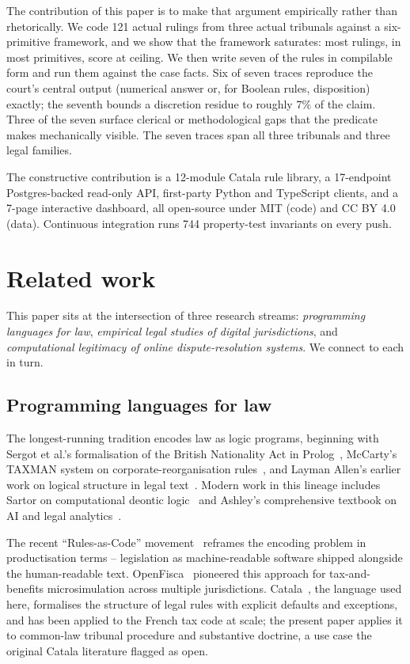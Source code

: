 \documentclass[11pt,letterpaper]{article}
\begin{document}
The contribution of this paper is to make that argument empirically rather than rhetorically. We code 121 actual rulings from three actual tribunals against a six-primitive framework, and we show that the framework saturates: most rulings, in most primitives, score at ceiling. We then write seven of the rules in compilable form and run them against the case facts. Six of seven traces reproduce the court's central output (numerical answer or, for Boolean rules, disposition) exactly; the seventh bounds a discretion residue to roughly 7\% of the claim. Three of the seven surface clerical or methodological gaps that the predicate makes mechanically visible. The seven traces span all three tribunals and three legal families.

The constructive contribution is a 12-module Catala rule library, a 17-endpoint Postgres-backed read-only API, first-party Python and TypeScript clients, and a 7-page interactive dashboard, all open-source under MIT (code) and CC BY 4.0 (data). Continuous integration runs 744 property-test invariants on every push.

\section{Related work}

This paper sits at the intersection of three research streams: \textit{programming languages for law}, \textit{empirical legal studies of digital jurisdictions}, and \textit{computational legitimacy of online dispute-resolution systems}. We connect to each in turn.

\subsection{Programming languages for law}

The longest-running tradition encodes law as logic programs, beginning with Sergot et al.'s formalisation of the British Nationality Act in Prolog~\cite{sergot}, McCarty's TAXMAN system on corporate-reorganisation rules~\cite{mccarty}, and Layman Allen's earlier work on logical structure in legal text~\cite{allen}. Modern work in this lineage includes Sartor on computational deontic logic~\cite{sartor} and Ashley's comprehensive textbook on AI and legal analytics~\cite{ashley}.

The recent ``Rules-as-Code'' movement~\cite{rac-oecd,mohun} reframes the encoding problem in productisation terms -- legislation as machine-readable software shipped alongside the human-readable text. OpenFisca~\cite{openfisca} pioneered this approach for tax-and-benefits microsimulation across multiple jurisdictions. Catala~\cite{catala}, the language used here, formalises the structure of legal rules with explicit defaults and exceptions, and has been applied to the French tax code at scale; the present paper applies it to common-law tribunal procedure and substantive doctrine, a use case the original Catala literature flagged as open.
\end{document}
